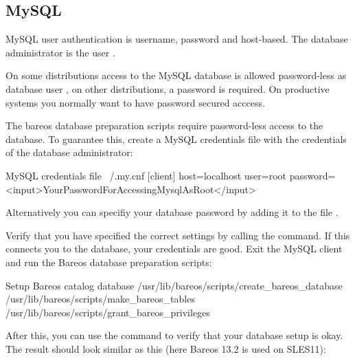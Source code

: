 \subsection{MySQL}

MySQL user authentication is username, password and host-based.
The database administrator is the user .

On some distributions access to the MySQL database is allowed password-less as database user ,
on other distributions, a password is required.
On productive systems you normally want to have password secured acccess.

The bareos database preparation scripts require password-less access to the database.
To guarantee this, create a MySQL credentials file  with the credentials of the database administrator:
\begin{config}{MySQL credentials file ~/.my.cnf}
[client]
host=localhost
user=root
password=<input>YourPasswordForAccessingMysqlAsRoot</input>
\end{config}
Alternatively you can specifiy your database password by adding it to the file .

Verify that you have specified the correct settings by calling the  command.
If this connects you to the database, your credentials are good.
Exit the MySQL client and run the Bareos database preparation scripts:
\begin{commands}{Setup Bareos catalog database}
/usr/lib/bareos/scripts/create_bareos_database
/usr/lib/bareos/scripts/make_bareos_tables
/usr/lib/bareos/scripts/grant_bareos_privileges
\end{commands}

After this, you can use the  command to verify that your database setup is okay.
The result should look similar as this (here Bareos 13.2 is used on SLES11):

